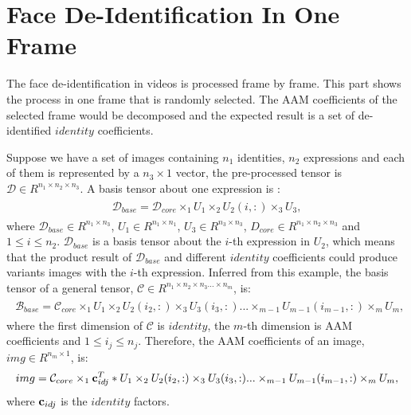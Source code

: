 	\section{Face De-Identification In One Frame}
	\label{sec:oneFrame}
	The face de-identification in videos is processed frame by frame. This part shows the process in one frame that is randomly
	selected. The AAM coefficients of the selected frame would be decomposed and the expected result is a set of de-identified 
	$identity$ coefficients.

	Suppose we have a set of images containing $n_1$ identities, $n_2$ expressions and each of them is represented by a 
	$n_3 \times 1$ vector, the pre-processed tensor is $\mathcal{D} \in R^{n_1 \times n_2 \times n_3}$. 
	A basis tensor about one expression is \cite{TPAMI09} : 
	\begin{align}
		\label{equ:base_tensor}
		\begin{split}
			\mathcal{D}_{base} = \mathcal{D}_{core} \times_1 U_1 \times_2 U_2(i,:) \times_3 U_3 ,
		\end{split}
	\end{align}
	where $\mathcal{D}_{base} \in R^{n_1 \times n_3}$, $U_1 \in R^{n_1 \times n_1}$, $U_3 \in R^{n_3 \times n_3}$,
	$D_{core} \in R^{n_1 \times n_2 \times n_3}$ and $1 \le i \le n_2$. $\mathcal{D}_{base}$ is a basis tensor about
	the $i$-th expression in $U_2$, which means that the product result of $\mathcal{D}_{base}$ and different $identity$
	coefficients could produce variants images with the $i$-th expression. Inferred from this example, the basis tensor 
	of a general tensor, $\mathcal{C} \in R^{n_1 \times n_2 \times n_3 ... \times n_m}$, is:
	\begin{align}
		\label{equ:general_base_tensor}
		\begin{split}
			\mathcal{B}_{base} = \mathcal{C}_{core} \times_1 U_1 \times_2 U_2(i_2,:) \times_3 U_3(i_3,:) ... \times_{m-1} U_{m-1}(i_{m-1},:) \times_m U_m ,
		\end{split}
	\end{align}
	where the first dimension of $\mathcal{C}$ is $identity$, the $m$-th dimension is AAM coefficients and $1 \le i_j \le n_j$. 
	Therefore, the AAM coefficients of an image, $img \in R^{n_m \times 1}$, is:
	\begin{align}
		\label{equ:img_representation}
		\begin{split}
			img = \mathcal{C}_{core} \times_1 {\bf c}_{idj}^T*U_1 \times_2 U_2(i_2,:) \times_3 U_3(i_3,:) ... \times_{m-1} U_{m-1}(i_{m-1},:) \times_m U_m ,
		\end{split}
	\end{align}
	where ${\bf c}_{idj}$ is the $identity$ factors.

